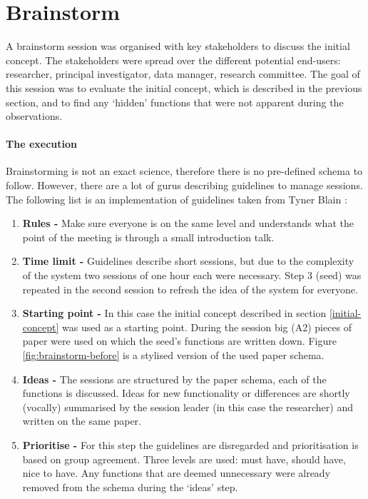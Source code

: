 \section{Brainstorm}
\label{brainstorm}

A brainstorm session was organised with key stakeholders to discuss the initial concept.
The stakeholders were spread over the different potential end-users: researcher, principal investigator, data manager, research committee.
The goal of this session was to evaluate the initial concept, which is described in the previous section, and to find any `hidden' functions that were not apparent during the observations.

\paragraph{The execution}
Brainstorming is not an exact science, therefore there is no pre-defined schema to follow.
However, there are a lot of gurus describing guidelines to manage sessions.
The following list is an implementation of guidelines taken from Tyner Blain \cite{brainstormWebsite}:

\begin{enumerate}
	\item \textbf{Rules -} Make sure everyone is on the same level and understands what the point of the meeting is through a small introduction talk.
	\item \textbf{Time limit -} Guidelines describe short sessions, but due to the complexity of the system two sessions of one hour each were necessary.
		Step 3 (seed) was repeated in the second session to refresh the idea of the system for everyone.
	\item \textbf{Starting point -} In this case the initial concept described in section \ref{initial-concept} was used as a starting point.
		During the session big (A2) pieces of paper were used on which the seed's functions are written down. Figure \ref{fig:brainstorm-before} is a stylised version of the used paper schema.
	\item \textbf{Ideas -} The sessions are structured by the paper schema, each of the functions is discussed.
		Ideas for new functionality or differences are shortly (vocally) summarised by the session leader (in this case the researcher) and written on the same paper.
	\item \textbf{Prioritise -} For this step the guidelines are disregarded and prioritisation is based on group agreement.
		Three levels are used: must have, should have, nice to have.
		Any functions that are deemed unnecessary were already removed from the schema during the `ideas' step.
\end{enumerate}

